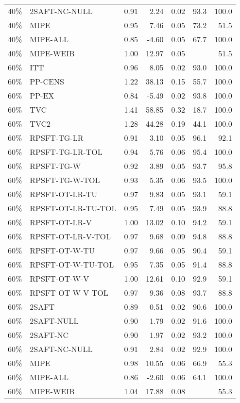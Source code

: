 \begin{table}[ht]
{\begin{tabular}{llrrrrr}
  40\% & 2SAFT-NC-NULL & 0.91 & 2.24 & 0.02 & 93.3 & 100.0 \\ 
  40\% & MIPE & 0.95 & 7.46 & 0.05 & 73.2 & 51.5 \\ 
  40\% & MIPE-ALL & 0.85 & -4.60 & 0.05 & 67.7 & 100.0 \\ 
  40\% & MIPE-WEIB & 1.00 & 12.97 & 0.05 &  & 51.5 \\ 
   \hline
60\% & ITT & 0.96 & 8.05 & 0.02 & 93.0 & 100.0 \\ 
  60\% & PP-CENS & 1.22 & 38.13 & 0.15 & 55.7 & 100.0 \\ 
  60\% & PP-EX & 0.84 & -5.49 & 0.02 & 93.8 & 100.0 \\ 
  60\% & TVC & 1.41 & 58.85 & 0.32 & 18.7 & 100.0 \\ 
  60\% & TVC2 & 1.28 & 44.28 & 0.19 & 44.1 & 100.0 \\ 
   \hline
60\% & RPSFT-TG-LR & 0.91 & 3.10 & 0.05 & 96.1 & 92.1 \\ 
  60\% & RPSFT-TG-LR-TOL & 0.94 & 5.76 & 0.06 & 95.4 & 100.0 \\ 
  60\% & RPSFT-TG-W & 0.92 & 3.89 & 0.05 & 93.7 & 95.8 \\ 
  60\% & RPSFT-TG-W-TOL & 0.93 & 5.35 & 0.06 & 93.5 & 100.0 \\ 
  60\% & RPSFT-OT-LR-TU & 0.97 & 9.83 & 0.05 & 93.1 & 59.1 \\ 
  60\% & RPSFT-OT-LR-TU-TOL & 0.95 & 7.49 & 0.05 & 93.9 & 88.8 \\ 
  60\% & RPSFT-OT-LR-V & 1.00 & 13.02 & 0.10 & 94.2 & 59.1 \\ 
  60\% & RPSFT-OT-LR-V-TOL & 0.97 & 9.68 & 0.09 & 94.8 & 88.8 \\ 
   \hline
60\% & RPSFT-OT-W-TU & 0.97 & 9.66 & 0.05 & 90.4 & 59.1 \\ 
  60\% & RPSFT-OT-W-TU-TOL & 0.95 & 7.35 & 0.05 & 91.4 & 88.8 \\ 
  60\% & RPSFT-OT-W-V & 1.00 & 12.61 & 0.10 & 92.9 & 59.1 \\ 
  60\% & RPSFT-OT-W-V-TOL & 0.97 & 9.36 & 0.08 & 93.7 & 88.8 \\ 
   \hline
60\% & 2SAFT & 0.89 & 0.51 & 0.02 & 90.6 & 100.0 \\ 
  60\% & 2SAFT-NULL & 0.90 & 1.79 & 0.02 & 91.6 & 100.0 \\ 
  60\% & 2SAFT-NC & 0.90 & 1.97 & 0.02 & 93.2 & 100.0 \\ 
  60\% & 2SAFT-NC-NULL & 0.91 & 2.84 & 0.02 & 92.9 & 100.0 \\ 
  60\% & MIPE & 0.98 & 10.55 & 0.06 & 66.9 & 55.3 \\ 
  60\% & MIPE-ALL & 0.86 & -2.60 & 0.06 & 64.1 & 100.0 \\ 
  60\% & MIPE-WEIB & 1.04 & 17.88 & 0.08 &  & 55.3 \\ 
   \hline
\end{tabular}
}
\end{table}
